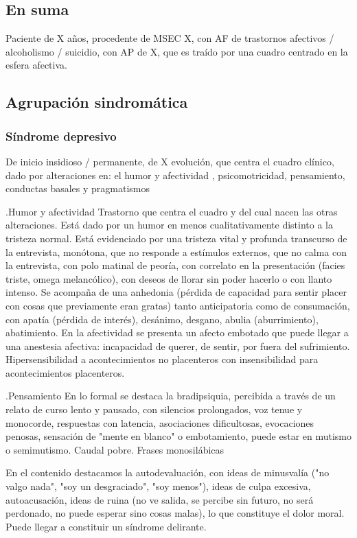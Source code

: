 \subsection*{En suma}
Paciente de X años, procedente de MSEC X, con AF de trastornos afectivos / alcoholismo / suicidio, con AP de X, que es traído por una cuadro centrado en la esfera afectiva.
\subsection*{Agrupación sindromática}
\subsubsection*{Síndrome depresivo}
De inicio insidioso / permanente, de X evolución, que centra el cuadro clínico, dado por alteraciones en: el humor y afectividad , psicomotricidad, pensamiento, conductas basales y pragmatismos

.Humor y afectividad
Trastorno que centra el cuadro y del cual nacen las otras alteraciones. Está dado por un humor en menos cualitativamente distinto a la tristeza normal. Está evidenciado por una tristeza vital y profunda transcurso de la entrevista, monótona, que no responde a estímulos externos, que no calma con la entrevista, con polo matinal de peoría, con correlato en la presentación (facies triste, omega melancólico), con deseos de llorar sin poder hacerlo o con llanto intenso. Se acompaña de una anhedonia (pérdida de capacidad para sentir placer con cosas que previamente eran gratas) tanto anticipatoria como de consumación, con apatía (pérdida de interés), desánimo, desgano, abulia (aburrimiento), abatimiento. En la afectividad se presenta un afecto embotado que puede llegar a una anestesia afectiva: incapacidad de querer, de sentir, por fuera del sufrimiento. Hipersensibilidad a acontecimientos no placenteros con insensibilidad para acontecimientos placenteros.

.Pensamiento
En lo formal se destaca la bradipsiquia, percibida a través de un relato de curso lento y pausado, con silencios prolongados, voz tenue y monocorde, respuestas con latencia, asociaciones dificultosas, evocaciones penosas, sensación de "mente en blanco" o embotamiento, puede estar en mutismo o semimutismo. Caudal pobre. Frases monosilábicas

En el contenido destacamos la autodevaluación, con ideas de minusvalía ("no valgo nada", "soy un desgraciado", "soy menos"), ideas de culpa excesiva, autoacusación, ideas de ruina (no ve salida, se percibe sin futuro, no será perdonado, no puede esperar sino cosas malas), lo que constituye el dolor moral. Puede llegar a constituir un síndrome delirante.

